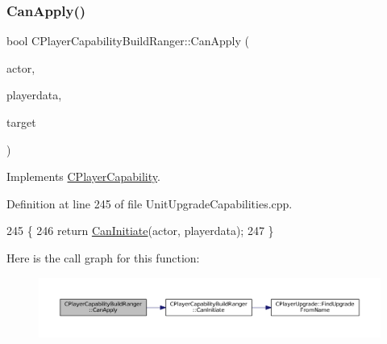 \subsubsection{\texorpdfstring{Can\+Apply()}{CanApply()}}
{\footnotesize\ttfamily bool C\+Player\+Capability\+Build\+Ranger\+::\+Can\+Apply (\begin{DoxyParamCaption}\item[{std\+::shared\+\_\+ptr$<$ \hyperlink{classCPlayerAsset}{C\+Player\+Asset} $>$}]{actor,  }\item[{std\+::shared\+\_\+ptr$<$ \hyperlink{classCPlayerData}{C\+Player\+Data} $>$}]{playerdata,  }\item[{std\+::shared\+\_\+ptr$<$ \hyperlink{classCPlayerAsset}{C\+Player\+Asset} $>$}]{target }\end{DoxyParamCaption})\hspace{0.3cm}{\ttfamily [virtual]}}



Implements \hyperlink{classCPlayerCapability_ae96263e0950f496492f8baeb877b9554}{C\+Player\+Capability}.



Definition at line 245 of file Unit\+Upgrade\+Capabilities.\+cpp.


\begin{DoxyCode}
245                                                                                                            
                                                        \{
246     \textcolor{keywordflow}{return} \hyperlink{classCPlayerCapabilityBuildRanger_ad8b45a3ffc7ee82d5550cc690823d82c}{CanInitiate}(actor, playerdata);
247 \}
\end{DoxyCode}
Here is the call graph for this function\+:\nopagebreak
\begin{figure}[H]
\begin{center}
\leavevmode
\includegraphics[width=350pt]{classCPlayerCapabilityBuildRanger_a2e688d8f68ab53402afe9303dd28754a_cgraph}
\end{center}
\end{figure}
\hypertarget{classCPlayerCapabilityBuildRanger_ad8b45a3ffc7ee82d5550cc690823d82c}{}\label{classCPlayerCapabilityBuildRanger_ad8b45a3ffc7ee82d5550cc690823d82c} 
